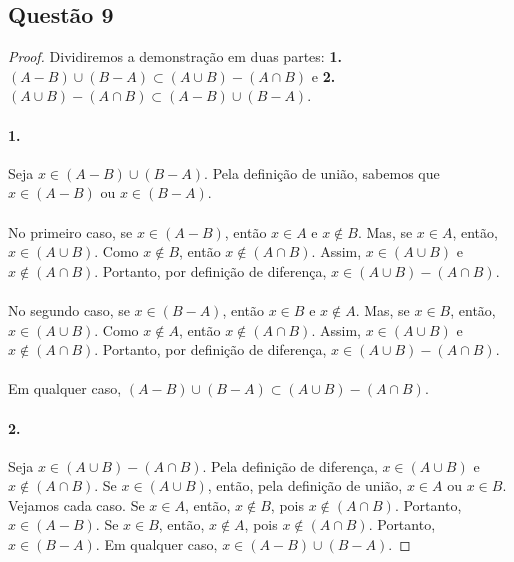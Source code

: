 \documentclass[9pt,twocolumn,a4paper]{article}
\begin{document}
    \subsection{Questão 9}
    \begin{proof}
    Dividiremos a demonstração em duas partes: \textbf{1.} $(A - B) \cup (B - A) \subset (A \cup B) - (A \cap B)$ e \textbf{2.} $(A \cup B) - (A \cap B) \subset (A - B) \cup (B - A)$.

    \paragraph{1.}
    Seja $x \in (A - B) \cup (B - A)$. Pela definição de união, sabemos que $x \in (A - B)$ ou $x \in (B - A)$. 
    
    \paragraph{}
    No primeiro caso, se $x \in (A - B)$, então $x \in A$ e $x \not\in B$. Mas, se $x \in A$, então, $x \in (A \cup B)$. Como $x \not\in B$, então $x \not\in (A \cap B)$. Assim, $x \in (A \cup B)$ e $x \not\in (A \cap B)$. Portanto, por definição de diferença, $x \in (A \cup B) - (A \cap B)$.

    \paragraph{}
    No segundo caso, se $x \in (B - A)$, então $x \in B$ e $x \not\in A$. Mas, se $x \in B$, então, $x \in (A \cup B)$. Como $x \not\in A$, então $x \not\in (A \cap B)$. Assim, $x \in (A \cup B)$ e $x \not\in (A \cap B)$. Portanto, por definição de diferença, $x \in (A \cup B) - (A \cap B)$.

    \paragraph{}
    Em qualquer caso, $(A - B) \cup (B - A) \subset (A \cup B) - (A \cap B)$.

    \paragraph{2.}
    Seja $x \in (A \cup B) - (A \cap B)$. Pela definição de diferença, $x \in (A \cup B)$ e $x \not\in (A \cap B)$. Se $x \in (A \cup B)$, então, pela definição de união, $x \in A $ ou $x \in B$. Vejamos cada caso. Se $x \in A$, então, $x \not\in B$, pois $x \not\in (A \cap B)$. Portanto, $x \in (A - B)$. Se $x \in B$, então, $x \not\in A$, pois $x \not\in (A \cap B)$. Portanto, $x \in (B - A)$. Em qualquer caso, $x \in (A - B) \cup (B - A)$. 


\end{proof}
\end{document}
